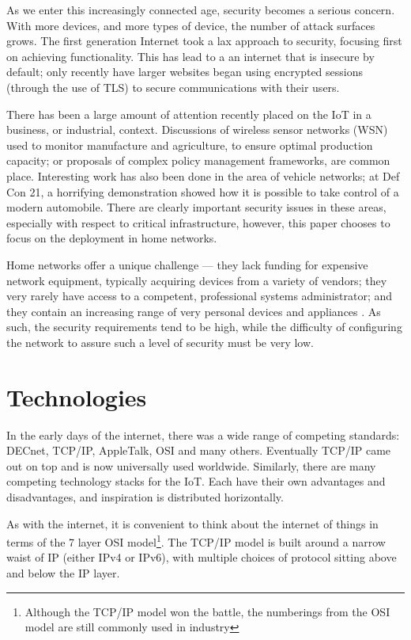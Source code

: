 \documentclass[11pt,journal,compsoc]{IEEEtran}
\begin{document}
As we enter this increasingly connected age, security becomes a serious
concern. With more devices, and more types of device, the number of attack
surfaces grows. The first generation Internet took a lax approach to security,
focusing first on achieving functionality. This has lead to a an internet that
is insecure by default; only recently have larger websites began using
encrypted sessions (through the use of TLS) to secure communications with their
users. 

There has been a large amount of attention recently placed on the IoT in a
business, or industrial, context. Discussions of wireless sensor networks (WSN)
used to monitor manufacture and agriculture, to ensure optimal production
capacity; or proposals of complex policy management frameworks, are common
place. Interesting work has also been done in the area of vehicle networks; at
Def Con 21, a horrifying demonstration showed how it is possible to take
control of a modern automobile. There are clearly important security issues in
these areas, especially with respect to critical infrastructure, however, this
paper chooses to focus on the deployment in home networks. 

Home networks offer a unique challenge — they lack funding for expensive
network equipment, typically acquiring devices from a variety of vendors; they
very rarely have access to a competent, professional systems administrator; and
they contain an increasing range of very personal devices and appliances
\cite{ACM_ModHome}. As such, the security requirements tend to be high, while
the difficulty of configuring the network to assure such a level of security
must be very low. 


\section{Technologies}
In the early days of the internet, there was a wide range of competing
standards: DECnet, TCP/IP, AppleTalk, OSI and many others.  Eventually TCP/IP
came out on top and is now universally used worldwide. Similarly, there are
many competing technology stacks for the IoT. Each have their own advantages
and disadvantages, and inspiration is distributed horizontally. 

As with the internet, it is convenient to think about the internet of things in
terms of the 7 layer OSI model\footnote{Although the TCP/IP model won the
battle, the numberings from the OSI model are still commonly used in industry}.
The TCP/IP model is built around a narrow waist of IP (either IPv4 or IPv6),
with multiple choices of protocol sitting above and below the IP layer. 
\end{document}
